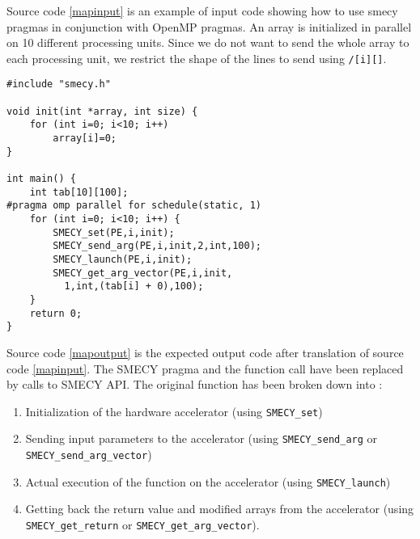 \documentclass[a4paper]{article}
\begin{document}
	Source code \ref{mapinput} is an example of input code showing how to use smecy pragmas in conjunction with OpenMP pragmas. An array is initialized in parallel on 10 different processing units. Since we do not want to send the whole array to each processing unit, we restrict the shape of the lines to send using \verb+/[i][]+.
	
	\begin{lstlisting}[label=mapoutput,caption={Expected output code.}]
#include "smecy.h"

void init(int *array, int size) {
	for (int i=0; i<10; i++)
		array[i]=0;
}

int main() {
	int tab[10][100];
#pragma omp parallel for schedule(static, 1)
	for (int i=0; i<10; i++) {
		SMECY_set(PE,i,init);
		SMECY_send_arg(PE,i,init,2,int,100);
		SMECY_launch(PE,i,init);
		SMECY_get_arg_vector(PE,i,init,
		  1,int,(tab[i] + 0),100);
	}
	return 0;
}
	\end{lstlisting}
	Source code \ref{mapoutput} is the expected output code after translation of source code \ref{mapinput}. The SMECY pragma and the function call have been replaced by calls to SMECY API. The original function has been broken down into :
	\begin{enumerate}
		\item Initialization of the hardware accelerator (using \verb+SMECY_set+)
		\item Sending input parameters to the accelerator (using \verb+SMECY_send_arg+ or \verb+SMECY_send_arg_vector+)
		\item Actual execution of the function on the accelerator (using \verb+SMECY_launch+)
		\item Getting back the return value and modified arrays from the accelerator (using \verb+SMECY_get_return+ or \verb+SMECY_get_arg_vector+).
	\end{enumerate}
	
\end{document}
